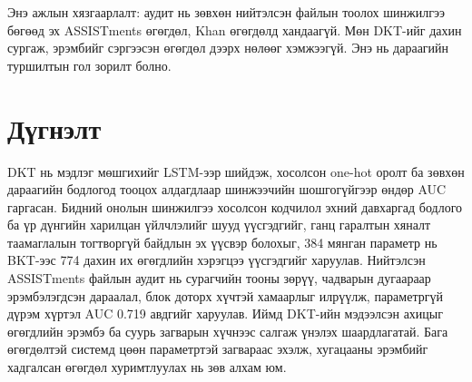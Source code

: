 \documentclass[10pt,twocolumn]{article}
\begin{document}
Энэ ажлын хязгаарлалт: аудит нь зөвхөн нийтэлсэн файлын тоолох шинжилгээ бөгөөд эх ASSISTments
өгөгдөл, Khan өгөгдөлд хандаагүй. Мөн DKT-ийг дахин сургаж, эрэмбийг сэргээсэн өгөгдөл дээрх
нөлөөг хэмжээгүй. Энэ нь дараагийн туршилтын гол зорилт болно.

\section*{Дүгнэлт}

DKT нь мэдлэг мөшгихийг LSTM-ээр шийдэж, хосолсон one-hot оролт ба зөвхөн дараагийн бодлогод
тооцох алдагдлаар шинжээчийн шошгогүйгээр өндөр AUC гаргасан. Бидний онолын шинжилгээ хосолсон
кодчилол эхний давхаргад бодлого ба үр дүнгийн харилцан үйлчлэлийг шууд үүсгэдгийг, ганц
гаралтын хяналт таамаглалын тогтворгүй байдлын эх үүсвэр болохыг, 384 мянган параметр нь BKT-ээс
774 дахин их өгөгдлийн хэрэгцээ үүсгэдгийг харуулав. Нийтэлсэн ASSISTments файлын аудит нь сурагчийн
тооны зөрүү, чадварын дугаараар эрэмбэлэгдсэн дараалал, блок доторх хүчтэй хамаарлыг илрүүлж,
параметргүй дүрэм хүртэл AUC 0.719 авдгийг харуулав. Иймд DKT-ийн мэдээлсэн ахицыг өгөгдлийн
эрэмбэ ба суурь загварын хүчнээс салгаж үнэлэх шаардлагатай. Бага өгөгдөлтэй системд цөөн
параметртэй загвараас эхэлж, хугацааны эрэмбийг хадгалсан өгөгдөл хуримтлуулах нь зөв алхам юм.
\end{document}
